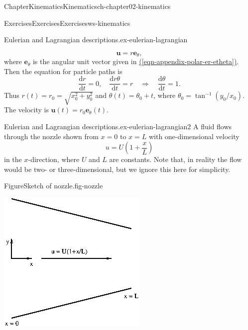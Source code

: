 \documentclass[oneside,10pt,]{book}
\newcommand{\xreffont}{\relax}
\numberwithin{equation}{section}
\newcommand{\de}{\mathrm{d}}
\newcommand{\dd}[2]{\frac{\de#1}{\de#2}}
\newcommand{\be}{\boldsymbol{e}}
\newcommand{\bu}{\boldsymbol{u}}
\begin{document}
\begin{chapterptx}{Chapter}{Kinematics}{}{Kinematics}{}{}{ch-chapter02-kinematics}
\begin{exercises-section}{Exercises}{Exercises}{}{Exercises}{}{}{ws-kinematics}
\begin{divisionexercise}{3}{Eulerian and Lagrangian descriptions.}{}{ex-eulerian-lagrangian}
\begin{enumerate}[font=\bfseries,label=(\alph*),ref=\alph*]
\begin{equation*}
\bu = r\be_\theta,
\end{equation*}
where \(\be_{\theta}\) is the angular unit vector given in \hyperref[eqn-appendix-polar-er-etheta]{({\xreffont\ref{eqn-appendix-polar-er-etheta}})}. Then the equation for particle paths is%
\begin{equation*}
\dd{r}{t} = 0,\quad\dd{r\theta}{t}= r\quad\Rightarrow\quad \dd{\theta}{t}=1.
\end{equation*}
Thus \(r(t)=r_0=\sqrt{x_0^2+y_0^2}\) and \(\theta(t)=\theta_0+t\), where \(\theta_0=\tan^{-1}(y_0/x_0)\). The velocity is \(\bu(t)=r_0\be_{\theta}(t)\).%
\end{enumerate}%
\end{divisionexercise}%
\begin{divisionexercise}{4}{Eulerian and Lagrangian descriptions.}{}{ex-eulerian-lagrangian2}%
A fluid flows through the nozzle shown from \(x=0\) to \(x=L\) with one-dimensional velocity%
\begin{equation*}
u=U\left(1+\frac{x}{L}\right)
\end{equation*}
in the \(x\)-direction, where \(U\) and \(L\) are constants. Note that, in reality the flow would be two- or three-dimensional, but we ignore this here for simplicity.%
 \begin{figureptx}{Figure}{Sketch of nozzle.}{fig-nozzle}{}%
\begin{image}{0.2}{0.6}{0.2}{}%
\includegraphics[width=\linewidth]{external/ch-chapter02-nozzle.png}

\end{image}
\end{figureptx}
\end{divisionexercise}
\end{exercises-section}
\end{chapterptx}
\end{document}

